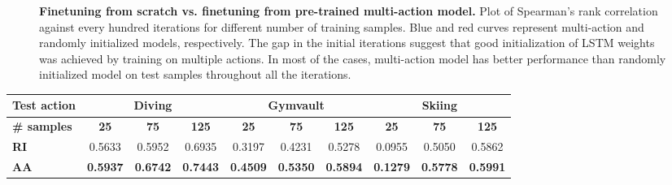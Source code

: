\documentclass[10pt,twocolumn,letterpaper]{article}
\begin{document}
\begin{figure*}[!t]
\caption{\textbf{Finetuning from scratch vs. finetuning from pre-trained multi-action model.} Plot of Spearman's rank correlation against every hundred iterations for different number of training samples. Blue and red curves represent multi-action and randomly initialized models, respectively. The gap in the initial iterations suggest that good initialization of LSTM weights was achieved by training on multiple actions. In most of the cases, multi-action model has better performance than randomly initialized model on test samples throughout all the iterations.}
\label{fig_ft_plots}
\end{figure*} \begin{table*}[t]
\centering
\small
\begin{tabular}{l|ccccccccc}
\toprule
\textbf{Test action} & \multicolumn{3}{c|}{\textbf{Diving}}                                                                    & \multicolumn{3}{c|}{\textbf{Gymvault}}                                                                  & \multicolumn{3}{c}{\textbf{Skiing}}                                                                    \\ \midrule
\textbf{\# samples}  & \multicolumn{1}{c|}{\textbf{25}} & \multicolumn{1}{c|}{\textbf{75}} & \multicolumn{1}{c|}{\textbf{125}} & \multicolumn{1}{c|}{\textbf{25}} & \multicolumn{1}{c|}{\textbf{75}} & \multicolumn{1}{c|}{\textbf{125}} & \multicolumn{1}{c|}{\textbf{25}} & \multicolumn{1}{c|}{\textbf{75}} & \multicolumn{1}{c}{\textbf{125}} \\ \midrule
\textbf{RI}          & 0.5633                           & 0.5952                           & 0.6935                            & 0.3197                           & 0.4231                           & 0.5278                            & 0.0955                           & 0.5050                           & 0.5862                            \\ 
\textbf{AA}        & \textbf{0.5937}                           & \textbf{0.6742                          } & \textbf{0.7443}                            & \textbf{0.4509                          } & \textbf{0.5350}                           & \textbf{0.5894                           } & \textbf{0.1279}                           & \textbf{0.5778}                           & \textbf{0.5991}                            \\ \bottomrule
\end{tabular}
\\
\rule{0pt}{8ex}
\begin{tabular}{ccccccccc}

\end{tabular}
\end{table*}
\end{document}
